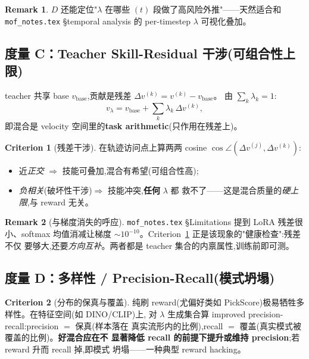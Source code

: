 \documentclass[11pt,a4paper]{article}
\theoremstyle{definition}
\newtheorem{remark}{Remark}
\newtheorem{criterion}{Criterion}
\begin{document}
\begin{remark}
$D$ 还能定位"$\lambda$ 在哪些 $(t)$ 段做了高风险外推"——天然适合和
\texttt{mof\_notes.tex} \S temporal analysis 的 per-timestep $\lambda$ 可视化叠加。
\end{remark}

\subsection{度量 C：Teacher Skill-Residual 干涉(可组合性上限)}
\label{ssec:crit_interference}

teacher 共享 base $v_{\text{base}}$,贡献是残差 $\Delta v^{(k)}=v^{(k)}-v_{\text{base}}$。
由 $\sum_k\lambda_k=1$:
\begin{equation}
v_\lambda=v_{\text{base}}+\sum_k\lambda_k\,\Delta v^{(k)},
\end{equation}
即混合是 velocity 空间里的\textbf{task arithmetic}(只作用在残差上)。

\begin{criterion}[残差干涉]
\label{crit:interference}
在轨迹访问点上算两两 cosine
$\cos\angle(\Delta v^{(j)},\Delta v^{(k)})$:
\begin{itemize}[leftmargin=1.5em]
\item 近\emph{正交} $\Rightarrow$ 技能可叠加,混合有希望(可组合性高);
\item \emph{负相关}(破坏性干涉)$\Rightarrow$ 技能冲突,\textbf{任何} $\lambda$ 都
救不了——这是混合质量的\emph{硬上限},与 reward 无关。
\end{itemize}
\end{criterion}

\begin{remark}[与梯度消失的呼应]
\texttt{mof\_notes.tex} \S Limitations 提到 LoRA 残差很小、softmax 均值消减让梯度
$\sim 10^{-10}$。Criterion~\ref{crit:interference} 正是该现象的"健康检查":残差不仅
要够大,还要\emph{方向互补}。两者都是 teacher 集合的内禀属性,训练前即可测。
\end{remark}

\subsection{度量 D：多样性 / Precision-Recall(模式坍塌)}
\label{ssec:crit_diversity}

\begin{criterion}[分布的保真与覆盖]
\label{crit:pr}
纯刷 reward(尤偏好类如 PickScore)极易牺牲多样性。在特征空间(如 DINO/CLIP)上,
对 $\lambda$ 生成集合算 improved precision-recall:precision $=$ 保真(样本落在
真实流形内的比例),recall $=$ 覆盖(真实模式被覆盖的比例)。\textbf{好混合应在不
显著降低 recall 的前提下提升或维持 precision};若 reward 升而 recall 掉,即模式
坍塌——一种典型 reward hacking。
\end{criterion}
\end{document}
